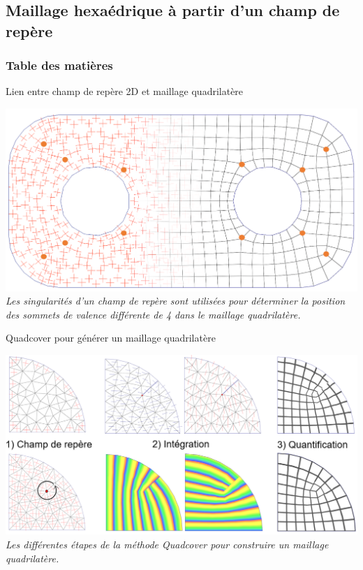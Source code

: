\documentclass{beamer}
\begin{document}
\subsection{Maillage hexaédrique à partir d'un champ de repère}
\begin{frame}
    \frametitle{Table des matières}
    \tableofcontents[currentsubsection, sectionstyle=show/shaded, subsectionstyle=show/shaded/hide]
\end{frame}
\begin{frame}{Lien entre champ de repère 2D et maillage quadrilatère}
    \begin{center}
        \includegraphics[width=\linewidth]{img/quadsimu/singus.PNG}
        \small{
            \textit{Les singularités d'un champ de repère sont utilisées pour déterminer la position des sommets de valence différente de 4 dans le maillage quadrilatère.}
        }
    \end{center}
\end{frame}
\begin{frame}{Quadcover pour générer un maillage quadrilatère}
    \begin{center}
        \includegraphics[width=\linewidth]{img/cubecover/pipeline.PNG}
        \small{
            \textit{Les différentes étapes de la méthode Quadcover pour construire un maillage quadrilatère.}
        }
    \end{center}
\end{frame}
\end{document}

